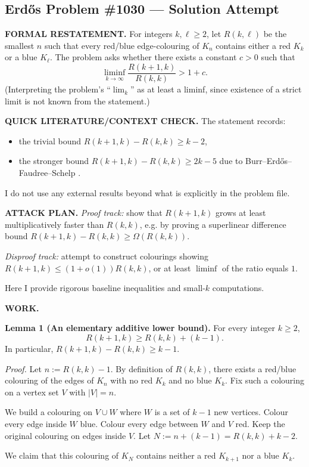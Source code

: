 \subsection*{Erd\H{o}s Problem \#1030 --- Solution Attempt}

\textbf{FORMAL RESTATEMENT.}
For integers $k,\ell\ge 2$, let $R(k,\ell)$ be the smallest $n$ such that every red/blue edge-colouring of $K_n$ contains either a red $K_k$ or a blue $K_\ell$.
The problem asks whether there exists a constant $c>0$ such that
\[
\liminf_{k\to\infty}\frac{R(k+1,k)}{R(k,k)} > 1+c.
\]
(Interpreting the problem's ``$\lim_k$'' as at least a liminf, since existence of a strict limit is not known from the statement.)

\textbf{QUICK LITERATURE/CONTEXT CHECK.}
The statement records:
\begin{itemize}
\item the trivial bound $R(k+1,k)-R(k,k)\ge k-2$,
\item the stronger bound $R(k+1,k)-R(k,k)\ge 2k-5$ due to Burr--Erd\H{o}s--Faudree--Schelp \cite{BEFS89}.
\end{itemize}
I do not use any external results beyond what is explicitly in the problem file.

\textbf{ATTACK PLAN.}
\emph{Proof track:} show that $R(k+1,k)$ grows at least multiplicatively faster than $R(k,k)$, e.g. by proving a superlinear difference bound $R(k+1,k)-R(k,k)\ge \Omega(R(k,k))$.

\emph{Disproof track:} attempt to construct colourings showing $R(k+1,k)\le (1+o(1))R(k,k)$, or at least $\liminf$ of the ratio equals $1$.

Here I provide rigorous baseline inequalities and small-$k$ computations.

\textbf{WORK.}

\textbf{Lemma 1 (An elementary additive lower bound).}
For every integer $k\ge 2$,
\[
R(k+1,k) \ge R(k,k) + (k-1).
\]
In particular, $R(k+1,k)-R(k,k)\ge k-1$.

\emph{Proof.}
Let $n:=R(k,k)-1$. By definition of $R(k,k)$, there exists a red/blue colouring of the edges of $K_n$ with no red $K_k$ and no blue $K_k$.
Fix such a colouring on a vertex set $V$ with $|V|=n$.

We build a colouring on $V\cup W$ where $W$ is a set of $k-1$ new vertices.
Colour every edge inside $W$ blue.
Colour every edge between $W$ and $V$ red.
Keep the original colouring on edges inside $V$.
Let $N:=n+(k-1)=R(k,k)+k-2$.

We claim that this colouring of $K_N$ contains neither a red $K_{k+1}$ nor a blue $K_k$.

